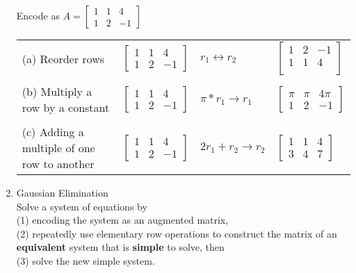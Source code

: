 \documentclass[11pt,fleqn]{article}
\newcommand{\bbm}{\begin{bmatrix}}
\newcommand{\ebm}{\end{bmatrix}}
\begin{document}
\begin{enumerate}
Encode  \:  \: as  \: $A=\bbm 1&1&4\\1&2&-1 \ebm$\\

\vspace{.2in}


\begin{tabularx}{\textwidth}{XXXX}
(a) Reorder rows& $\bbm 1&1&4\\1&2&-1 \ebm$&$r_1 \leftrightarrow r_2$&$\bbm 1&2&-1\\1&1&4\\ \ebm$\\
&&\\
(b) Multiply a row by a constant& $\bbm 1&1&4\\1&2&-1 \ebm$&$\pi*r_1 \to r_1$&$\bbm \pi&\pi&4\pi\\1&2&-1 \ebm$\\
 &&\\
 (c) Adding a multiple of one row to another &$\bbm 1&1&4\\1&2&-1 \ebm$&$2r_1+r_2 \to r_2$&$\bbm 1&1&4\\3&4&7 \ebm$\\
\end{tabularx}

\item Gaussian Elimination\\

Solve a system of equations by \\

(1) encoding the system as an augmented matrix, \\

(2) repeatedly use elementary row operations to construct the matrix of an \textbf{equivalent} system that is \textbf{simple} to solve, then \\

(3) solve the new simple system.
	
\end{enumerate}
\end{document}
